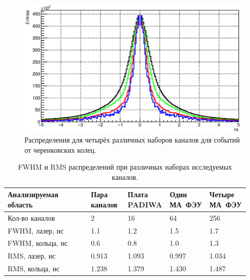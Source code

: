 \begin{figure}
\includegraphics[width=1.0\textwidth]{pictures/25_TimePrecision_evolution_rings.eps}
\caption{Распределения для четырёх различных наборов каналов для событий от черенковских колец.}
\label{fig:TimeResEvolutionRings}
\end{figure}

\begin{table}[h]
\caption{FWHM и RMS распределений при различных наборах исследуемых каналов.}
\label{tabl:EvolutionParams}
\begin{tabular}{ | p{0.34\linewidth} | p{0.15\linewidth} | p{0.15\linewidth} | p{0.15\linewidth} | p{0.15\linewidth} | }
	\hline
	Анализируемая область & Пара каналов & Плата PADIWA & Один МА~ФЭУ & Четыре МА~ФЭУ \\
	\hline
	Кол-во каналов & 2 & 16 & 64 & 256 \\
	\hline
	FWHM, лазер, нс & 1.1 & 1.2 & 1.5 & 1.7 \\
	\hline
	FWHM, кольца, нс & 0.6 & 0.8 & 1.0 & 1.3 \\
	\hline
	RMS, лазер, нс & 0.913 & 1.093 & 0.997 & 1.034 \\
	\hline
	RMS, кольца, нс & 1.238 & 1.379 & 1.430 & 1.487 \\
	\hline
\end{tabular}
\end{table}
